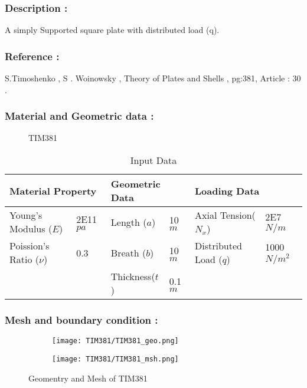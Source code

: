 \documentclass[VM.tex]{subfiles}
\begin{document}
\subsubsection*{Description : }
A simply Supported square plate with distributed load (q). 
\subsubsection*{Reference : }
S.Timoshenko , S . Woinowsky , Theory of Plates and Shells , pg:381, Article : 30 . \\

\subsubsection*{Material and Geometric data : }


\begin{figure}[h!]
\centering

\caption{TIM381} \label{TIM381sch}
\end{figure}
\begin{table}[h!]
\renewcommand{\arraystretch}{1.5}
\centering
\caption{Input Data}
\label{my-labelsdqf}
\begin{tabular}{|ll|ll|ll|}
\hline
\multicolumn{2}{|l|}{\cellcolor[HTML]{C0C0C0}Material Property} & \multicolumn{2}{l|}{\cellcolor[HTML]{C0C0C0}Geometric Data} & \multicolumn{2}{l|}{\cellcolor[HTML]{C0C0C0}Loading Data} \\ \hline  \hline
Young's Modulus ($E$)          & 2E11 $pa$         & Length ($a$)        & 10 $m$        &      Axial Tension($N_x$) & 2E7 $N/m$      \\
Poission's Ratio ($\nu$)       & 0.3         & Breath ($b$)        & 10 $m$          & Distributed Load ($q$)        & 1000 $N/m^2$       \\ 
    &         & Thickness($t$)        & 0.1 $m$          &    &        \\ \hline
\end{tabular}
\end{table}




\subsubsection*{Mesh and boundary condition : }



\begin{figure}[h!]
\begin{subfigure}{.45\textwidth}
\texttt{[image: TIM381/TIM381\_geo.png]}
\end{subfigure} \hfill
\begin{subfigure}{.45\textwidth}
\texttt{[image: TIM381/TIM381\_msh.png]}
\end{subfigure}
\caption{Geomentry and Mesh of TIM381}
\end{figure}
\end{document}
